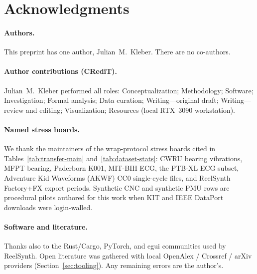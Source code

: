 \section*{Acknowledgments}
\label{sec:acknowledgments}

\paragraph{Authors.}
This preprint has one author, Julian~M.~Kleber. There are no co-authors.

\paragraph{Author contributions (CRediT).}
Julian~M.~Kleber performed all roles: Conceptualization; Methodology; Software; Investigation; Formal analysis; Data curation; Writing---original draft; Writing---review and editing; Visualization; Resources (local RTX~3090 workstation).

\paragraph{Named stress boards.}
We thank the maintainers of the wrap-protocol stress boards cited in Tables~\ref{tab:transfer-main} and~\ref{tab:dataset-stats}:
CWRU bearing vibrations, MFPT bearing, Paderborn K001, MIT-BIH ECG, the PTB-XL ECG subset, Adventure Kid Waveforms (AKWF) CC0 single-cycle files, and ReelSynth Factory+FX export periods.
Synthetic CNC and synthetic PMU rows are procedural pilots authored for this work when KIT and IEEE DataPort downloads were login-walled.

\paragraph{Software and literature.}
Thanks also to the Rust/Cargo, PyTorch, and egui communities used by ReelSynth.
Open literature was gathered with local OpenAlex / Crossref / arXiv providers (Section~\ref{sec:tooling}).
Any remaining errors are the author's.
